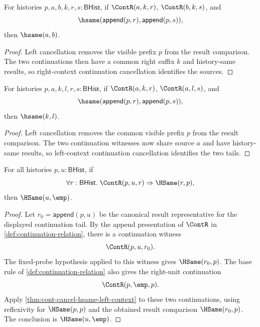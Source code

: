 \begin{theorem}
\label{thm:cont-prefixed-result-common-suffix-source-deterministic}
For histories $p,a,b,k,r,s:\mathsf{BHist}$, if $\ContR(a,k,r)$,
$\ContR(b,k,s)$, and
$$
\hsame(\mathsf{append}(p,r),\mathsf{append}(p,s)),
$$
then $\hsame(a,b)$.
\end{theorem}
\begin{proof}
Left cancellation removes the visible prefix $p$ from the result comparison.
The two continuations then have a common right suffix $k$ and history-same
results, so right-context continuation cancellation identifies the sources.
\end{proof}

\begin{theorem}
\label{thm:cont-prefixed-result-common-source-tail-deterministic}
For histories $p,a,k,l,r,s:\mathsf{BHist}$, if $\ContR(a,k,r)$,
$\ContR(a,l,s)$, and
$$
\hsame(\mathsf{append}(p,r),\mathsf{append}(p,s)),
$$
then $\hsame(k,l)$.
\end{theorem}
\begin{proof}
Left cancellation removes the common visible prefix $p$ from the result
comparison. The two continuation witnesses now share source $a$ and have
history-same results, so left-context continuation cancellation identifies the
two tails.
\end{proof}

\begin{theorem}
\label{thm:cont-fixed-right-unit-probe-empty-tail}
For all histories $p,u:\mathsf{BHist}$, if
$$
\forall r:\mathsf{BHist}.\; \ContR(p,u,r)\Rightarrow \HSame(r,p),
$$
then $\HSame(u,\emp)$.
\end{theorem}
\begin{proof}
Let $r_0=\mathsf{append}(p,u)$ be the canonical result representative for the displayed continuation tail. By the append presentation of $\ContR$ in \autoref{def:continuation-relation}, there is a continuation witness
$$
\ContR(p,u,r_0).
$$
The fixed-probe hypothesis applied to this witness gives $\HSame(r_0,p)$. The base rule of \autoref{def:continuation-relation} also gives the right-unit continuation
$$
\ContR(p,\emp,p).
$$
Apply \autoref{thm:cont-cancel-hsame-left-context} to these two continuations, using reflexivity for $\HSame(p,p)$ and the obtained result comparison $\HSame(r_0,p)$. The conclusion is $\HSame(u,\emp)$.
\end{proof}

